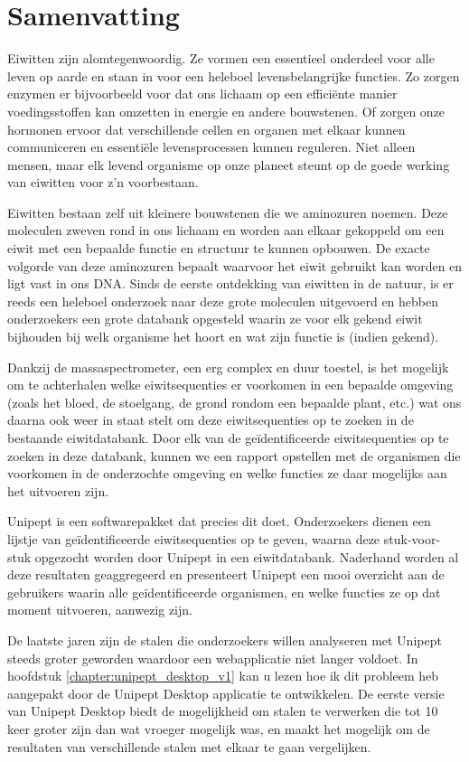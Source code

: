 \chapter*{Samenvatting}

Eiwitten zijn alomtegenwoordig.
Ze vormen een essentieel onderdeel voor alle leven op aarde en staan in voor een heleboel levensbelangrijke functies.
Zo zorgen enzymen er bijvoorbeeld voor dat ons lichaam op een efficiënte manier voedingsstoffen kan omzetten in energie en andere bouwstenen.
Of zorgen onze hormonen ervoor dat verschillende cellen en organen met elkaar kunnen communiceren en essentiële levensprocessen kunnen reguleren.
Niet alleen mensen, maar elk levend organisme op onze planeet steunt op de goede werking van eiwitten voor z'n voorbestaan.

Eiwitten bestaan zelf uit kleinere bouwstenen die we aminozuren noemen.
Deze moleculen zweven rond in ons lichaam en worden aan elkaar gekoppeld om een eiwit met een bepaalde functie en structuur te kunnen opbouwen.
De exacte volgorde van deze aminozuren bepaalt waarvoor het eiwit gebruikt kan worden en ligt vast in ons DNA.
Sinds de eerste ontdekking van eiwitten in de natuur, is er reeds een heleboel onderzoek naar deze grote moleculen uitgevoerd en hebben onderzoekers een grote databank opgesteld waarin ze voor elk gekend eiwit bijhouden bij welk organisme het hoort en wat zijn functie is (indien gekend).

Dankzij de massaspectrometer, een erg complex en duur toestel, is het mogelijk om te achterhalen welke eiwitsequenties er voorkomen in een bepaalde omgeving (zoals het bloed, de stoelgang, de grond rondom een bepaalde plant, etc.) wat ons daarna ook weer in staat stelt om deze eiwitsequenties op te zoeken in de bestaande eiwitdatabank.
Door elk van de geïdentificeerde eiwitsequenties op te zoeken in deze databank, kunnen we een rapport opstellen met de organismen die voorkomen in de onderzochte omgeving en welke functies ze daar mogelijks aan het uitvoeren zijn.

Unipept is een softwarepakket dat precies dit doet.
Onderzoekers dienen een lijstje van geïdentificeerde eiwitsequenties op te geven, waarna deze stuk-voor-stuk opgezocht worden door Unipept in een eiwitdatabank.
Naderhand worden al deze resultaten geaggregeerd en presenteert Unipept een mooi overzicht aan de gebruikers waarin alle geïdentificeerde organismen, en welke functies ze op dat moment uitvoeren, aanwezig zijn.

De laatste jaren zijn de stalen die onderzoekers willen analyseren met Unipept steeds groter geworden waardoor een webapplicatie niet langer voldoet.
In hoofdstuk \ref{chapter:unipept_desktop_v1} kan u lezen hoe ik dit probleem heb aangepakt door de Unipept Desktop applicatie te ontwikkelen.
De eerste versie van Unipept Desktop biedt de mogelijkheid om stalen te verwerken die tot 10 keer groter zijn dan wat vroeger mogelijk was, en maakt het mogelijk om de resultaten van verschillende stalen met elkaar te gaan vergelijken.

